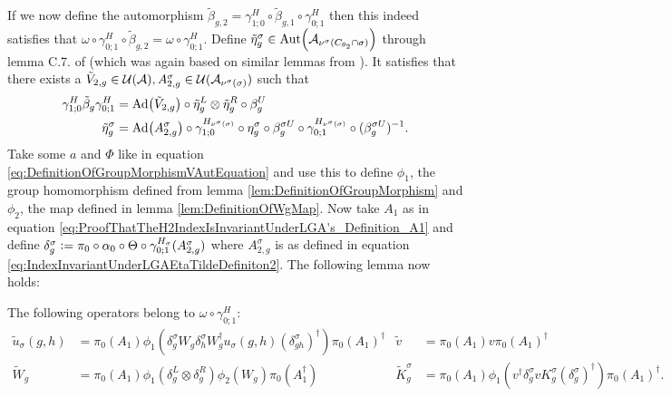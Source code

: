 \documentclass[11pt,a4paper,twoside]{article}
\numberwithin{equation}{section}
\begin{document}
	If we now define the automorphism $\tilde{\beta}_{g,2}=\gamma^{H}_{1;0}\circ\tilde\beta_{g,1}\circ\gamma^{H}_{0;1}$ then this indeed satisfies that $\omega\circ\gamma^{H}_{0;1}\circ\tilde{\beta}_{g,2}=\omega\circ\gamma^{H}_{0;1}$. Define $\tilde\eta_g^\sigma\in\Aut{\AA_{\nu^{\sigma}(C_{\theta_2}\cap\sigma)}}$ through lemma C.7. of \cite{jappens2023spt} (which was again based on similar lemmas from \cite{ogata2021h3gmathbb}). It satisfies that there exists a $\tilde V_{2,g}\in\mathcal U(\mathcal A),A_{2,g}^{\sigma}\in\mathcal U(\mathcal A_{\nu^\sigma(\sigma)})$ such that
	\begin{align}
		\label{eq:IndexInvariantUnderLGAEtaTildeDefiniton1}
		\gamma^{H}_{1;0}\tilde{\beta}_g\gamma^{H}_{0;1}&=\Ad{\tilde V_{2,g}}\circ\tilde{\eta}_g^L\otimes\tilde{\eta}_g^R\circ\beta_g^U\\
		\label{eq:IndexInvariantUnderLGAEtaTildeDefiniton2}
		\tilde{\eta}_g^\sigma&=\Ad{A_{2,g}^\sigma}\circ\gamma^{H_{\nu^{\sigma}(\sigma)}}_{1;0}\circ\eta_g^\sigma\circ\beta_g^{\sigma U}\circ\gamma^{H_{\nu^{\sigma}(\sigma)}}_{0;1}\circ(\beta_g^{\sigma U})^{-1}.
	\end{align}
	Take some $a$ and $\Phi$ like in equation \eqref{eq:DefinitionOfGroupMorphismVAutEquation} and use this to define $\phi_1$, the group homomorphism defined from lemma \ref{lem:DefinitionOfGroupMorphism} and $\phi_2$, the map defined in lemma \ref{lem:DefinitionOfWgMap}. Now take $A_1$ as in equation \eqref{eq:ProofThatTheH2IndexIsInvariantUnderLGA's_Definition_A1} and define $\delta_g^\sigma\vcentcolon= \pi_0\circ\alpha_0\circ\Theta\circ\gamma^{H_\sigma}_{0;1}(A^\sigma_{2,g})$ where $A^\sigma_{2,g}$ is as defined in equation \eqref{eq:IndexInvariantUnderLGAEtaTildeDefiniton2}. The following lemma now holds:
	\begin{lemma}\label{lem:OperatorsBelongingToOmegaAfterH}
		The following operators belong to $\omega\circ\gamma^{H}_{0;1}:$
		\begin{align}
			\tilde u_\sigma(g,h)&=\pi_0(A_1) \phi_1\left(\delta^\sigma_g W_g\delta^\sigma_h W_g^\dagger u_\sigma(g,h)(\delta^\sigma_{gh})^\dagger\right)\pi_0(A_1)^\dagger&\tilde{v}&=\pi_0(A_1)v\pi_0(A_1)^\dagger\\
			\tilde{W}_g&=\pi_0(A_1)\phi_1(\delta^L_g\otimes\delta^R_g)\phi_2( W_g)\pi_0(A_1^\dagger)&\tilde{K}_g^\sigma&=\pi_0(A_1)\phi_1(v^\dagger \delta_g^\sigma v K_g^\sigma (\delta_g^\sigma)^\dagger) \pi_0(A_1)^\dagger.
		\end{align}
	\end{lemma}
\end{document}
